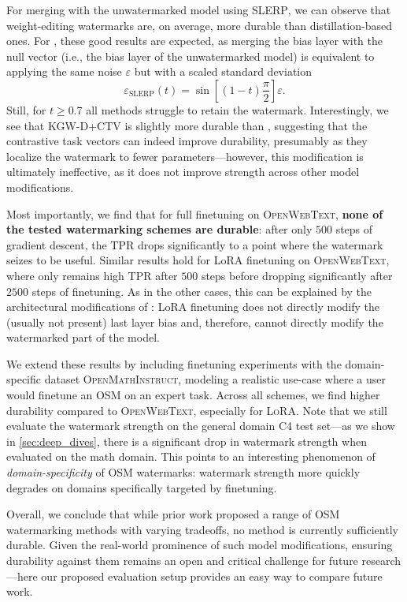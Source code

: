 For merging with the unwatermarked model using \textsc{SLERP}, we can observe that weight-editing watermarks are, on average, more durable than distillation-based ones.
For \unremovable, these good results are expected, as merging the bias layer with the null vector (i.e., the bias layer of the unwatermarked model) is equivalent to applying the same noise $\varepsilon$ but with a scaled standard deviation
\begin{equation}
    \varepsilon_{\text{SLERP}}(t) = \sin[(1-t)\frac{\pi}{2}] \varepsilon.
\end{equation}
Still, for $t \geq 0.7$ all methods struggle to retain the watermark.
Interestingly, we see that \textsc{KGW-D+CTV} is slightly more durable than \KGW, suggesting that the contrastive task vectors can indeed improve durability, presumably as they localize the watermark to fewer parameters---however, this modification is ultimately ineffective, as it does not improve strength across other model modifications.

Most importantly, we find that for full finetuning on \textsc{OpenWebText}, \textbf{none of the tested watermarking schemes are durable}: after only $500$ steps of gradient descent, the TPR drops significantly to a point where the watermark seizes to be useful.  
Similar results hold for LoRA finetuning on \textsc{OpenWebText}, where only \unremovable remains high TPR after $500$ steps before dropping significantly after $2500$ steps of finetuning. As in the other cases, this can be explained by the architectural modifications of \unremovable: LoRA finetuning does not directly modify the (usually not present) last layer bias and, therefore, cannot directly modify the watermarked part of the model.

We extend these results by including finetuning experiments with the domain-specific dataset \textsc{OpenMathInstruct}, modeling a realistic use-case where a user would finetune an OSM on an expert task.
Across all schemes, we find higher durability compared to \textsc{OpenWebText}, especially for \textsc{LoRA}.
Note that we still evaluate the watermark strength on the general domain C4 test set---as we show in \cref{sec:deep_dives}, there is a significant drop in watermark strength when evaluated on the math domain. 
This points to an interesting phenomenon of \emph{domain-specificity} of OSM watermarks: watermark strength more quickly degrades on domains specifically targeted by finetuning. 

Overall, we conclude that while prior work proposed a range of OSM watermarking methods with varying tradeoffs, no method is currently sufficiently durable.
Given the real-world prominence of such model modifications, ensuring durability against them remains an open and critical challenge for future research---here our proposed evaluation setup provides an easy way to compare future work.
